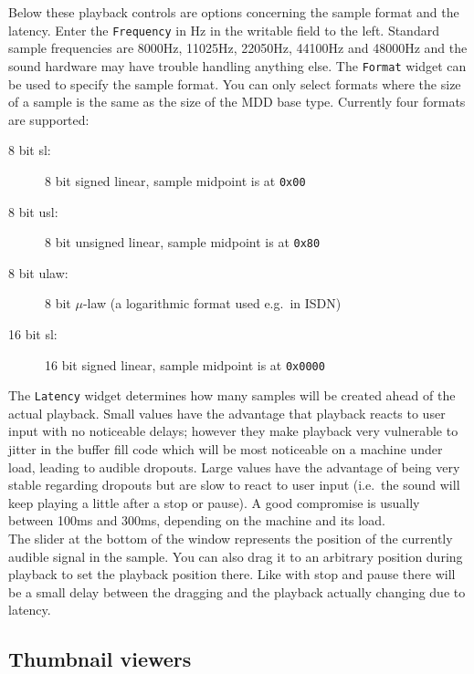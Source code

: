 \documentclass[11pt]{article}
\begin{document}
Below these playback controls are options concerning the sample format and the latency.
Enter the \texttt{Frequency} in Hz in the writable field to the left. Standard sample frequencies
are 8000Hz, 11025Hz, 22050Hz, 44100Hz and 48000Hz and the sound hardware may have trouble
handling anything else. The \texttt{Format} widget can be used to specify the sample format.
You can only select formats where the size of a sample is the same as the size of the MDD
base type. Currently four formats are supported:

\begin{description}
\item[8 bit sl:] 8 bit signed linear, sample midpoint is at \texttt{0x00}
\item[8 bit usl:] 8 bit unsigned linear, sample midpoint is at \texttt{0x80}
\item[8 bit ulaw:] 8 bit $\mu$-law (a logarithmic format used e.g.\ in ISDN)
\item[16 bit sl:] 16 bit signed linear, sample midpoint is at \texttt{0x0000}
\end{description}

The \texttt{Latency} widget determines how many samples will be created ahead of the
actual playback. Small values have the advantage that playback reacts to user
input with no noticeable delays; however they make playback very vulnerable to
jitter in the buffer fill code which will be most noticeable on a machine
under load, leading to audible dropouts. Large values have the advantage of
being very stable regarding dropouts but are slow to react to user input
(i.e.\ the sound will keep playing a little after a stop or pause). A good compromise
is usually between 100ms and 300ms, depending on the machine and its load.\\
The slider at the bottom of the window represents the position of the currently
audible signal in the sample. You can also drag it to an arbitrary position during
playback to set the playback position there. Like with stop and pause there will
be a small delay between the dragging and the playback actually changing due to
latency.


\subsection{Thumbnail viewers}
\label{ThumbnailDisplayMode}
\end{document}
